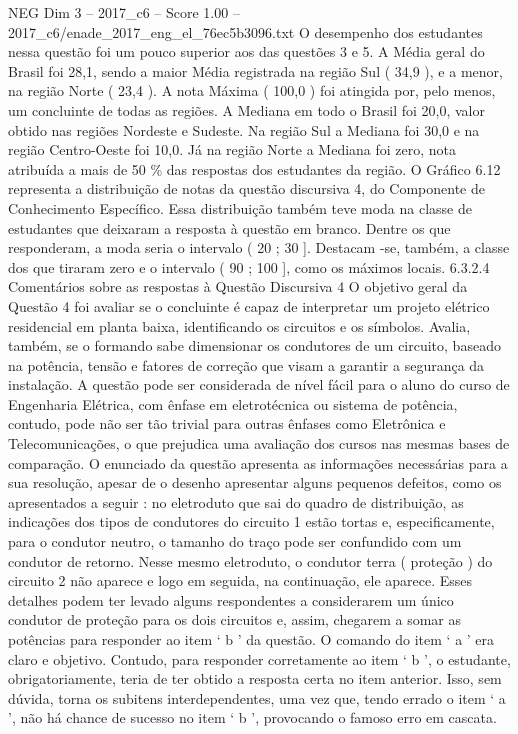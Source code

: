\begin{textsample}{NEG Dim 3 – 2017\_c6 – Score 1.00 – 2017\_c6/enade\_2017\_eng\_el\_76ec5b3096.txt}
O desempenho dos estudantes nessa questão foi um pouco superior aos das questões 3 e 5.
A Média geral do Brasil foi 28,1, sendo a maior Média registrada na região Sul ( 34,9 ), e a menor, na região Norte ( 23,4 ).
A nota Máxima ( 100,0 ) foi atingida por, pelo menos, um concluinte de todas as regiões.
A Mediana em todo o Brasil foi 20,0, valor obtido nas regiões Nordeste e Sudeste.
Na região Sul a Mediana foi 30,0 e na região Centro-Oeste foi 10,0.
Já na região Norte a Mediana foi zero, nota atribuída a mais de 50 \% das respostas dos estudantes da região.
O Gráfico 6.12 representa a distribuição de notas da questão discursiva 4, do Componente de Conhecimento Específico.
Essa distribuição também teve moda na classe de estudantes que deixaram a resposta à questão em branco.
Dentre os que responderam, a moda seria o intervalo ( 20 ; 30 ].
Destacam -se, também, a classe dos que tiraram zero e o intervalo ( 90 ; 100 ], como os máximos locais. 6.3.2.4 Comentários sobre as respostas à Questão Discursiva 4 O objetivo geral da Questão 4 foi avaliar se o concluinte é capaz de interpretar um projeto elétrico residencial em planta baixa, identificando os circuitos e os símbolos.
Avalia, também, se o formando sabe dimensionar os condutores de um circuito, baseado na potência, tensão e fatores de correção que visam a garantir a segurança da instalação.
A questão pode ser considerada de nível fácil para o aluno do curso de Engenharia Elétrica, com ênfase em eletrotécnica ou sistema de potência, contudo, pode não ser tão trivial para outras ênfases como Eletrônica e Telecomunicações, o que prejudica uma avaliação dos cursos nas mesmas bases de comparação.
O enunciado da questão apresenta as informações necessárias para a sua resolução, apesar de o desenho apresentar alguns pequenos defeitos, como os apresentados a seguir : no eletroduto que sai do quadro de distribuição, as indicações dos tipos de condutores do circuito 1 estão tortas e, especificamente, para o condutor neutro, o tamanho do traço pode ser confundido com um condutor de retorno.
Nesse mesmo eletroduto, o condutor terra ( proteção ) do circuito 2 não aparece e logo em seguida, na continuação, ele aparece.
Esses detalhes podem ter levado alguns respondentes a considerarem um único condutor de proteção para os dois circuitos e, assim, chegarem a somar as potências para responder ao item ‘ b ’ da questão.
O comando do item ‘ a ’ era claro e objetivo.
Contudo, para responder corretamente ao item ‘ b ’, o estudante, obrigatoriamente, teria de ter obtido a resposta certa no item anterior.
Isso, sem dúvida, torna os subitens interdependentes, uma vez que, tendo errado o item ‘ a ’, não há chance de sucesso no item ‘ b ’, provocando o famoso erro em cascata.

\end{textsample}
